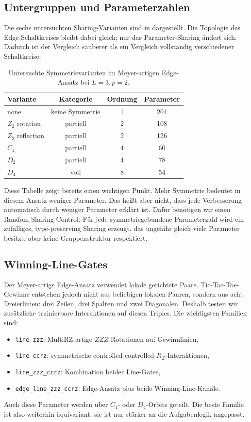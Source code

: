 \subsection{Untergruppen und Parameterzahlen}\label{subsec:groups}

Die sechs untersuchten Sharing-Varianten sind in  dargestellt. Die Topologie des Edge-Schaltkreises bleibt dabei gleich; nur das Parameter-Sharing ändert sich. Dadurch ist der Vergleich sauberer als ein Vergleich vollständig verschiedener Schaltkreise.

\begin{table}[t]
\centering
\caption{Untersuchte Symmetrievarianten im Meyer-artigen Edge-Ansatz bei $L=3,p=2$.}
\label{tab:groups}
\begin{tabular}{lccc}
\toprule
Variante & Kategorie & Ordnung & Parameter\\
\midrule
none & keine Symmetrie & 1 & 204\\
$Z_2$ rotation & partiell & 2 & 108\\
$Z_2$ reflection & partiell & 2 & 126\\
$C_4$ & partiell & 4 & 60\\
$D_2$ & partiell & 4 & 78\\
$D_4$ & voll & 8 & 54\\
\bottomrule
\end{tabular}
\end{table}

Diese Tabelle zeigt bereits einen wichtigen Punkt. Mehr Symmetrie bedeutet in diesem Ansatz weniger Parameter. Das heißt aber nicht, dass jede Verbesserung automatisch durch weniger Parameter erklärt ist. Dafür benötigen wir einen Random-Sharing-Control: Für jede symmetriegebundene Parameterzahl wird ein zufälliges, type-preserving Sharing erzeugt, das ungefähr gleich viele Parameter besitzt, aber keine Gruppenstruktur respektiert.

\subsection{Winning-Line-Gates}\label{subsec:linegates}

Der Meyer-artige Edge-Ansatz verwendet lokale gerichtete Paare. Tic-Tac-Toe-Gewinne entstehen jedoch nicht aus beliebigen lokalen Paaren, sondern aus acht Dreierlinien: drei Zeilen, drei Spalten und zwei Diagonalen. Deshalb testen wir zusätzliche trainierbare Interaktionen auf diesen Triples. Die wichtigsten Familien sind:
\begin{itemize}
\item \texttt{line\_zzz}: MultiRZ-artige $ZZZ$-Rotationen auf Gewinnlinien,
\item \texttt{line\_ccrz}: symmetrische controlled-controlled-$R_Z$-Interaktionen,
\item \texttt{line\_zzz\_ccrz}: Kombination beider Line-Gates,
\item \texttt{edge\_line\_zzz\_ccrz}: Edge-Ansatz plus beide Winning-Line-Kanäle.
\end{itemize}
Auch diese Parameter werden über $C_4$- oder $D_4$-Orbits geteilt. Die beste Familie ist also weiterhin äquivariant; sie ist nur stärker an die Aufgabenlogik angepasst.

